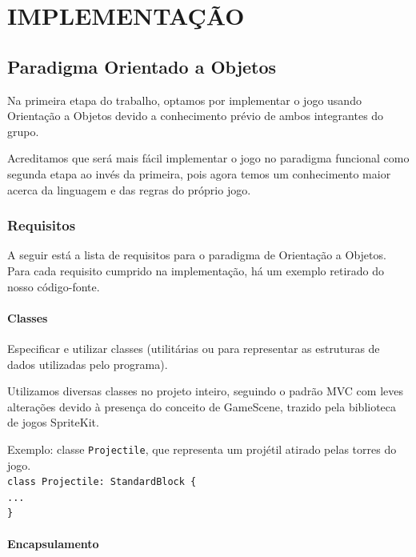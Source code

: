 \documentclass[rel_mlp]{iiufrgs}
\newcommand\tab[1][1cm]{\hspace*{#1}}
\begin{document}

\chapter{IMPLEMENTAÇÃO} \label{intro}

\section{Paradigma Orientado a Objetos} \label{intro}

Na primeira etapa do trabalho, optamos por implementar o jogo usando Orientação a Objetos devido a conhecimento prévio de ambos integrantes do grupo.

Acreditamos que será mais fácil implementar o jogo no paradigma funcional como segunda etapa ao invés da primeira, pois agora temos um conhecimento maior acerca da linguagem e das regras do próprio jogo.

\subsection{Requisitos}

A seguir está a lista de requisitos para o paradigma de Orientação a Objetos. Para cada requisito cumprido na implementação, há um exemplo retirado do nosso código-fonte.

\subsubsection{Classes}

Especificar e utilizar classes (utilitárias ou para representar as estruturas de dados utilizadas pelo programa).

Utilizamos diversas classes no projeto inteiro, seguindo o padrão MVC com leves alterações devido à presença do conceito de GameScene, trazido pela biblioteca de jogos SpriteKit.

Exemplo: classe \texttt{Projectile}, que representa um projétil atirado pelas torres do jogo.
\texttt{\\class Projectile: StandardBlock \{\\\tab ...\\\}}


\subsubsection{Encapsulamento}
\end{document}
